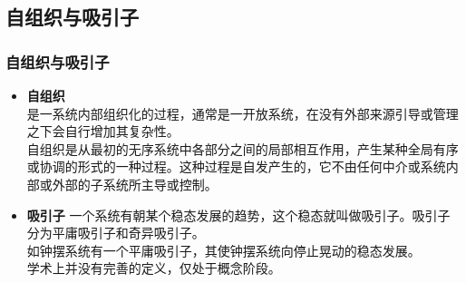 \subsection*{自组织与吸引子}

	\begin{frame}
		\frametitle{自组织与吸引子}
		
		\begin{itemize} \itemsep=2ex
			\item \textbf{自组织} \\
					是一系统内部组织化的过程，通常是一开放系统，在没有外部来源引导或管理之下会自行增加其复杂性。\\
					自组织是从最初的无序系统中各部分之间的局部相互作用，产生某种全局有序或协调的形式的一种过程。这种过程是自发产生的，它不由任何中介或系统内部或外部的子系统所主导或控制。
			\item \textbf{吸引子}
					一个系统有朝某个稳态发展的趋势，这个稳态就叫做吸引子。吸引子分为平庸吸引子和奇异吸引子。\\
					如钟摆系统有一个平庸吸引子，其使钟摆系统向停止晃动的稳态发展。\\
					学术上并没有完善的定义，仅处于概念阶段。
		\end{itemize}

	\end{frame}


















	

